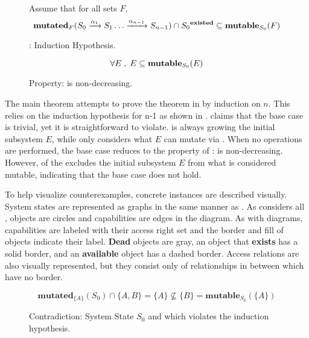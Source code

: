 \begin{figure}
Assume that for all sets \(F\),
\[
\mathbf{mutated}_{F}(S_0 \xrightarrow {\alpha_1} S_1 \dots \xrightarrow {\alpha_{n-1}} S_{n-1}) \cap {S_0}^{\mathbf{existed}} \subseteq \mathbf{mutable}_{S_0}(F)
\]
\caption{\modellbl{} : Induction Hypothesis.\label{def:SW:mainIH}}
\end{figure}

\begin{figure}
\[
\forall E \;,\; E \subseteq \mathbf{mutable}_{S_0}(E)
\]
\caption{Property: \mutable{} is non-decreasing.\label{prop:SW:mutable:nondecreasing}}
\end{figure}


The main theorem \TMSW{} attempts to prove the theorem in  by induction on \(n\).
This relies on the induction hypothesis for n-1 as shown in .
\TMSW{} claims that the base case is trivial, yet it is straightforward to violate.
\mutated{} is always growing the initial subsystem \(E\), while \mutable{} only considers what \(E\) can mutate via \potacc{}.
When no operations are performed, the base case reduces to the property of : \mutable{} is non-decreasing.
However, \thmMutationIsMutable{} of the \TMSW{} excludes the initial subsystem \(E\) from what is considered mutable, indicating that the base case does not hold.

To help visualize counterexamples, concrete instances are described visually.
System states are represented as graphs in the same manner as \TMmodelName{}.
As \TMSW{} considers all \TMobjs{} \TMactive{}, objects are circles and capabilities are edges in the \TMsystemState{} diagram.  
As with \TMmodelName{} diagrams, capabilities are labeled with their access right set and the border and fill of objects indicate their label.
{\bf Dead} objects are gray, an object that {\bf exists} has a solid border, and an {\bf available} object has a dashed border.
Access relations are also visually represented, but they consist only of relationships in \rightscpo{} between \TMobjs{} which have no border.


\begin{figure}
\centering
{}
\[
\mathbf{mutated}_{\{A\}}(S_0) \cap \{A,B\} = \{A\} \nsubseteq \{B\} = \mathbf{mutable}_{S_0}(\{A\})
\]
\caption{Contradiction: \label{fig:SW:mainIH}System State \(S_0\) and  which violates the induction hypothesis.\label{cont:SW:mainIH}}
\end{figure}

